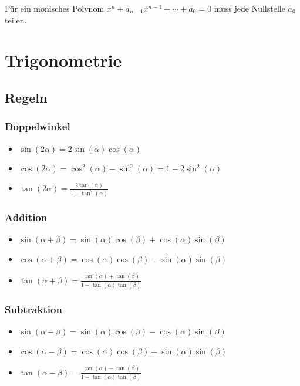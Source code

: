 \documentclass[a4paper,10pt]{article}
\begin{document}
Für ein monisches Polynom $x^n + a_{n-1} x^{n-1} + \cdots + a_0 = 0$ muss jede Nullstelle $a_0$ teilen.

\section{Trigonometrie}

\subsection{Regeln}

\subsubsection{Doppelwinkel}
\begin{itemize}
 \item $\sin(2\alpha) = 2 \sin(\alpha) \cos(\alpha)$
 \item $\cos(2\alpha) = \cos^2(\alpha) - \sin^2(\alpha) = 1 - 2 \sin^2(\alpha)$
 \item $\tan(2\alpha) = \frac{2\tan(\alpha)}{1 - \tan^2(\alpha)}$
\end{itemize}

\subsubsection{Addition}
\begin{itemize}
 \item $\sin(\alpha + \beta) = \sin(\alpha) \cos(\beta) + \cos(\alpha) \sin(\beta)$
 \item $\cos(\alpha + \beta) = \cos(\alpha) \cos(\beta) - \sin(\alpha) \sin(\beta)$
 \item $\tan(\alpha + \beta) = \frac{\tan(\alpha) + \tan(\beta)}{1 - \tan(\alpha) \tan(\beta)}$
\end{itemize}

\subsubsection{Subtraktion}
\begin{itemize}
 \item $\sin(\alpha - \beta) = \sin(\alpha) \cos(\beta) - \cos(\alpha)\sin(\beta)$
 \item $\cos(\alpha - \beta) = \cos(\alpha) \cos(\beta) + \sin(\alpha)\sin(\beta)$
 \item $\tan(\alpha - \beta) = \frac{\tan(\alpha) - \tan(\beta)}{1+\tan(\alpha) \tan(\beta)}$
\end{itemize}
\end{document}
